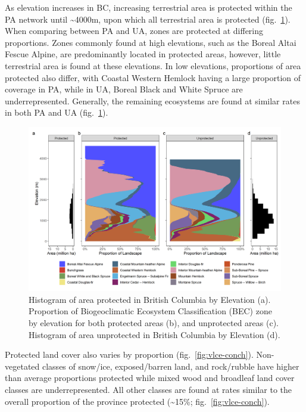 \documentclass[10pt,oneside]{article}
\makeatletter
\def\maxwidth{\ifdim\Gin@nat@width>\linewidth\linewidth
\else\Gin@nat@width\fi}
\let\Oldincludegraphics\includegraphics
\renewcommand{\includegraphics}[1]{\Oldincludegraphics[width=\maxwidth]{#1}}
\makeatother
\begin{document}
As elevation increases in BC, increasing terrestrial area is protected
within the PA network until \textasciitilde4000m, upon which all
terrestrial area is protected (fig.~\ref{fig:bec-elev}). When comparing
between PA and UA, zones are protected at differing proportions. Zones
commonly found at high elevations, such as the Boreal Altai Fescue
Alpine, are predominantly located in protected areas, however, little
terrestrial area is found at these elevations. In low elevations,
proportions of area protected also differ, with Coastal Western Hemlock
having a large proportion of coverage in PA, while in UA, Boreal Black
and White Spruce are underrepresented. Generally, the remaining
ecosystems are found at similar rates in both PA and UA
(fig.~\ref{fig:bec-elev}).

\begin{figure}
\hypertarget{fig:bec-elev}{%
\centering
\includegraphics{figures/bec_elev_hist.png}
\caption{Histogram of area protected in British Columbia by Elevation
(a). Proportion of Biogeoclimatic Ecosystem Classification (BEC) zone by
elevation for both protected areas (b), and unprotected areas (c).
Histogram of area unprotected in British Columbia by Elevation
(d).}\label{fig:bec-elev}
}
\end{figure}

Protected land cover also varies by proportion
(fig.~\ref{fig:vlce-conch}). Non-vegetated classes of snow/ice,
exposed/barren land, and rock/rubble have higher than average
proportions protected while mixed wood and broadleaf land cover classes
are underrepresented. All other classes are found at rates similar to
the overall proportion of the province protected (\textasciitilde15\%;
fig.~\ref{fig:vlce-conch}).
\end{document}
